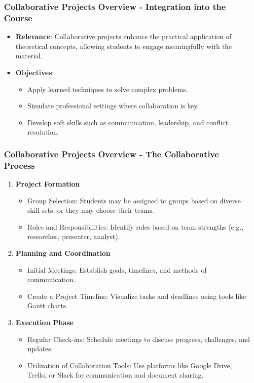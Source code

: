 \documentclass[aspectratio=169]{beamer}
\begin{document}
\begin{frame}[fragile]
    \frametitle{Collaborative Projects Overview - Integration into the Course}
    \begin{itemize}
        \item \textbf{Relevance}:
        Collaborative projects enhance the practical application of theoretical concepts, allowing students to engage meaningfully with the material.
        \item \textbf{Objectives}:
        \begin{itemize}
            \item Apply learned techniques to solve complex problems.
            \item Simulate professional settings where collaboration is key.
            \item Develop soft skills such as communication, leadership, and conflict resolution.
        \end{itemize}
    \end{itemize}
\end{frame}

\begin{frame}[fragile]
    \frametitle{Collaborative Projects Overview - The Collaborative Process}
    \begin{enumerate}
        \item \textbf{Project Formation}
        \begin{itemize}
            \item Group Selection: Students may be assigned to groups based on diverse skill sets, or they may choose their teams.
            \item Roles and Responsibilities: Identify roles based on team strengths (e.g., researcher, presenter, analyst).
        \end{itemize}
        
        \item \textbf{Planning and Coordination}
        \begin{itemize}
            \item Initial Meetings: Establish goals, timelines, and methods of communication.
            \item Create a Project Timeline: Visualize tasks and deadlines using tools like Gantt charts.
        \end{itemize}
        
        \item \textbf{Execution Phase}
        \begin{itemize}
            \item Regular Check-ins: Schedule meetings to discuss progress, challenges, and updates.
            \item Utilization of Collaboration Tools: Use platforms like Google Drive, Trello, or Slack for communication and document sharing.
        \end{itemize}
    \end{enumerate}
\end{frame}
\end{document}
